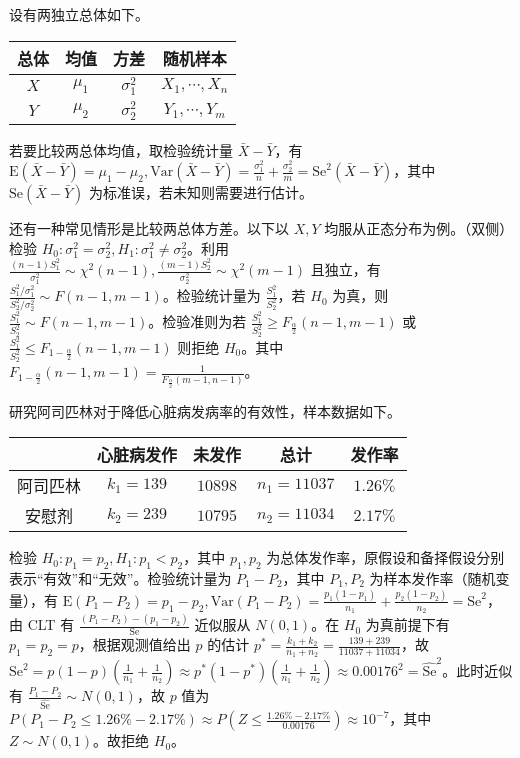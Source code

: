 \documentclass[../main.tex]{subfiles}
\begin{document}
设有两独立总体如下。

\bigskip
\begin{tabular}{|c|c|c|c|}
    \hline
    总体 & 均值    & 方差         & 随机样本         \\
    \hline
    $X$  & $\mu_1$ & $\sigma_1^2$ & $X_1,\cdots,X_n$ \\
    \hline
    $Y$  & $\mu_2$ & $\sigma_2^2$ & $Y_1,\cdots,Y_m$ \\
    \hline
\end{tabular}
\bigskip

若要比较两总体均值，取检验统计量 $\bar X-\bar Y$，有 $\mathrm E(\bar X-\bar Y)=\mu_1-\mu_2,\mathrm{Var}(\bar X-\bar Y)=\frac{\sigma_1^2}n+\frac{\sigma_2^2}m=\mathrm{Se}^2(\bar X-\bar Y)$，其中 $\mathrm{Se}(\bar X-\bar Y)$ 为标准误，若未知则需要进行估计。

还有一种常见情形是比较两总体方差。以下以 $X,Y$ 均服从正态分布为例。（双侧）检验 $H_0:\sigma_1^2=\sigma_2^2,H_1:\sigma_1^2\neq\sigma_2^2$。利用 $\frac{(n-1)S_1^2}{\sigma_1^2}\sim\chi^2(n-1),\frac{(m-1)S_2^2}{\sigma_2^2}\sim\chi^2(m-1)$ 且独立，有 $\frac{S_1^2/\sigma_1^2}{S_2^2/\sigma_2^2}\sim F(n-1,m-1)$。检验统计量为 $\frac{S_1^2}{S_2^2}$，若 $H_0$ 为真，则 $\frac{S_1^2}{S_2^2}\sim F(n-1,m-1)$。检验准则为若 $\frac{S_1^2}{S_2^2}\geq F_{\frac\alpha2}(n-1,m-1)$ 或 $\frac{S_1^2}{S_2^2}\leq F_{1-\frac\alpha2}(n-1,m-1)$ 则拒绝 $H_0$。其中 $F_{1-\frac\alpha2}(n-1,m-1)=\frac1{F_{\frac\alpha2}(m-1,n-1)}$。

\begin{example}
    研究阿司匹林对于降低心脏病发病率的有效性，样本数据如下。

    \bigskip
    \begin{tabular}{|c|c|c|c|c|}
        \hline
                 & 心脏病发作 & 未发作  & 总计        & 发作率   \\
        \hline
        阿司匹林 & $k_1=139$  & $10898$ & $n_1=11037$ & $1.26\%$ \\
        \hline
        安慰剂   & $k_2=239$  & $10795$ & $n_2=11034$ & $2.17\%$ \\
        \hline
    \end{tabular}
    \bigskip

    检验 $H_0:p_1=p_2,H_1:p_1<p_2$，其中 $p_1,p_2$ 为总体发作率，原假设和备择假设分别表示“有效”和“无效”。检验统计量为 $P_1-P_2$，其中 $P_1,P_2$ 为样本发作率（随机变量），有 $\mathrm E(P_1-P_2)=p_1-p_2,\mathrm{Var}(P_1-P_2)=\frac{p_1(1-p_1)}{n_1}+\frac{p_2(1-p_2)}{n_2}=\mathrm{Se}^2$，由 CLT 有 $\frac{(P_1-P_2)-(p_1-p_2)}{\mathrm{Se}}$ 近似服从 $N(0,1)$。在 $H_0$ 为真前提下有 $p_1=p_2=p$，根据观测值给出 $p$ 的估计 $p^*=\frac{k_1+k_2}{n_1+n_2}=\frac{139+239}{11037+11034}$，故 $\mathrm{Se}^2=p(1-p)(\frac 1{n_1}+\frac 1{n_2})\approx p^*(1-p^*)(\frac 1{n_1}+\frac 1{n_2})\approx0.00176^2=\widehat{\mathrm{Se}}^2$。此时近似有 $\frac{P_1-P_2}{\widehat{\mathrm{Se}}}\sim N(0,1)$，故 $p$ 值为 $P(P_1-P_2\leq1.26\%-2.17\%)\approx P(Z\leq\frac{1.26\%-2.17\%}{0.00176})\approx 10^{-7}$，其中 $Z\sim N(0,1)$。故拒绝 $H_0$。
\end{example}
\end{document}
